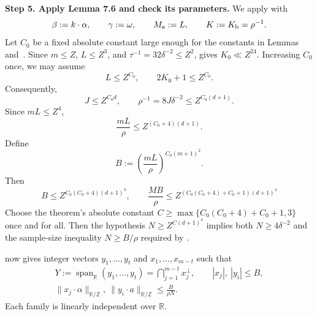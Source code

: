 \documentclass[twoside]{aomart}
\makeatletter
\theoremstyle{paperplain}
\theoremstyle{paperdefinition}
\renewenvironment{proof}[1][\proofname]{\par\pushQED{\qed}%
  \normalfont\topsep6\p@\@plus3\p@\relax\trivlist
  \item[\hskip\labelsep\itshape #1\@addpunct{.}]\ignorespaces
}{\popQED\endtrivlist\@endpefalse}
\numberwithin{equation}{section}
\makeatother
\begin{document}
\begin{proof}
\par
\medskip
\noindent\textbf{Step 5. Apply Lemma 7.6 and check its parameters.}
We apply  with
\begin{equation*}
 \beta:=k\cdot\alpha,\qquad
 \gamma:=\omega,\qquad
 M_{\rm a}:=L,\qquad
 K:=K_{\rm b}=\rho^{-1}.
\end{equation*}
Let $C_0$ be a fixed absolute constant large enough for the constants
in Lemmas~ and~. Since
$m\le Z$, $L\le Z^3$, and $\tau^{-1}=32\delta^{-2}\le Z^2$,
 gives $K_0\ll Z^{24}$. Increasing $C_0$ once,
we may assume
\begin{equation*}
 L\le Z^{C_0},\qquad 2K_0+1\le Z^{C_0}.
\end{equation*}
Consequently,
\begin{equation*}
 J\le Z^{C_0d},\qquad
 \rho^{-1}=8J\delta^{-2}\le Z^{C_0(d+1)}.
\end{equation*}
Since $mL\le Z^4$,
\[
 \frac{mL}{\rho}\le Z^{(C_0+4)(d+1)}.
\]
Define
\begin{equation*}
 B:=\left(\frac{mL}{\rho}\right)^{C_0(m+1)^2}.
\end{equation*}
Then
\begin{equation*}
 B\le Z^{C_0(C_0+4)(d+1)^3},
 \qquad
 \frac{MB}{\rho}
 \le Z^{(C_0(C_0+4)+C_0+1)(d+1)^4}
\end{equation*}
Choose the theorem's absolute constant
$C\ge\max\{C_0(C_0+4)+C_0+1,3\}$ once and for all. Then the hypothesis
$N\ge Z^{C(d+1)^4}$ implies both $N\ge4\delta^{-2}$ and the sample-size inequality
$N\ge B/\rho$ required by .

 now gives integer vectors
$y_1,\ldots,y_t$ and $x_1,\ldots,x_{m-t}$ such that
\begin{equation}
 \begin{gathered}
 Y:=\operatorname{span}_{\mathbb R}(y_1,\ldots,y_t)
   =\bigcap_{j=1}^{m-t}x_j^\perp,\qquad
 |x_j|,\ |y_i|\le B,\\
 \|x_j\cdot\alpha\|_{\mathbb R/\mathbb Z},\
 \|y_i\cdot a\|_{\mathbb R/\mathbb Z}
 \le \frac{B}{\rho N}.
 \end{gathered}
\label{inv:eq:horizontal-relations}
\end{equation}
Each family is linearly independent over $\mathbb R$.


\end{proof}
\end{document}
